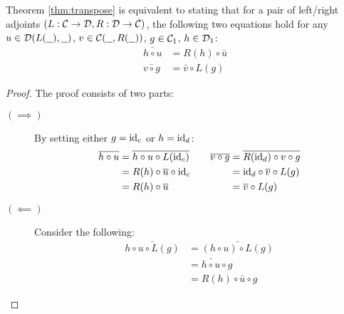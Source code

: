 \begin{theorem}
  Theorem \ref{thm:transpose} is equivalent to stating that for a pair of
  left/right adjoints $(L:\mathcal{C}\to \mathcal{D}, R:\mathcal{D}\to \mathcal{C})$, the following two equations
  hold for any $u\in \mathcal{D}(L(\underline{\ \ }), \underline{\ \ })$, $v\in \mathcal{C}(\underline{\ \ }, R(\underline{\ \ }))$, $g \in
  \mathcal{C}_1$, $h\in \mathcal{D}_1$:
  \begin{align*}
    \bar{h\circ u} &= R(h) \circ \bar{u}\\
    \bar{v\circ g} &= \bar{v} \circ L(g)
  \end{align*}

  \begin{proof}
    The proof consists of two parts:
    \begin{description}
      \item[$(\implies)$] By setting either $g=\mathrm{id}_c$ or $h=\mathrm{id}_d$:
        \[
          \begin{aligned}
            \overline{h\circ u}
              &= \overline{h\circ u \circ L(\mathrm{id}_c)}\\
              &= R(h) \circ \overline{u} \circ \mathrm{id}_c\\
              &= R(h) \circ \overline{u}
          \end{aligned}
          \qquad
          \begin{aligned}
            \overline{v\circ g}
              &= \overline{R(\mathrm{id}_d)\circ v\circ g}\\
              &= \mathrm{id}_d \circ \overline{v} \circ L(g)\\
              &= \overline{v} \circ L(g)
          \end{aligned}
        \]
      \item[$(\impliedby)$] Consider the following:
        \[
          \begin{aligned}
            \bar{h \circ u\circ L(g)}
              &= \bar{(h \circ u)\circ L(g)}\\
              &= \bar{h\circ u} \circ g\\
              &= R(h) \circ \bar{u} \circ g
          \end{aligned}
        \]
    \end{description}
  \end{proof}
\end{theorem}

